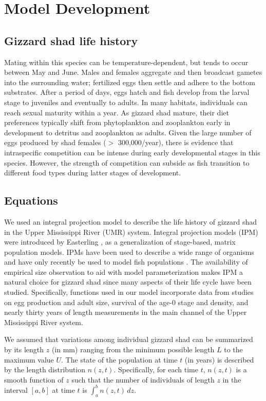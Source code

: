 \documentclass[preprint,review,12pt,authoryear]{elsarticle}
\def\ds{\displaystyle}
\begin{document}
\section{Model Development}
\subsection{Gizzard shad life history}
Mating within this species can be temperature-dependent, but tends to occur between May and June. 
Males and females aggregate and then broadcast gametes into the surrounding water; fertilized eggs then settle and adhere to the bottom substrates. 
After a period of days, eggs hatch and fish develop from the larval stage to juveniles and eventually to adults. 
In many habitats, individuals can reach sexual maturity within a year. As gizzard shad mature, their diet preferences typically shift from phytoplankton and zooplankton early in development to detritus and zooplankton as adults. 
Given the large number of eggs produced by shad females ($>$ 300,000/year), there is evidence that intraspecific competition can be intense during early developmental stages in this species. 
However, the strength of competition can subside as fish transition to different food types during latter stages of development.   

\subsection{Equations}
We used an integral projection model to describe the life history of gizzard shad in the Upper Mississippi River (UMR) system. 
Integral projection models (IPM) were introduced by Easterling \citep{easterling2000size}, as a generalization of stage-based, matrix population models. 
IPMs have been used to describe a wide range of organisms \citep{ellner2016data, merow2014advancing, rees2014building} and have only recently be used to model fish populations \citep{erickson2017integral, liao2019dynamic, white2016fitting, pollesch2022developing}.
The availability of empirical size observation to aid with model parameterization makes IPM a natural choice for gizzard shad since many aspects of their life cycle have been studied. 
Specifically, functions used in our model incorporate data from studies on egg production and adult size,  survival of the age-0 stage and density, and nearly thirty years of length measurements in the main channel of the Upper Mississippi River system.

We assumed that variations among individual gizzard shad can be summarized by its length $z$ (in mm) ranging from the minimum possible length $L$ to the maximum value $U$. 
The state of the population at time $t$ (in years) is described by the length distribution $n(z,t)$. 
Specifically, for each time $t$, $n(z,t)$ is a smooth function of $z$ such that the number of individuals of length $z$ in the interval $[a,b]$ at time $t$ is $\ds \int_a^b n(z,t) \, dz$. 
\end{document}

